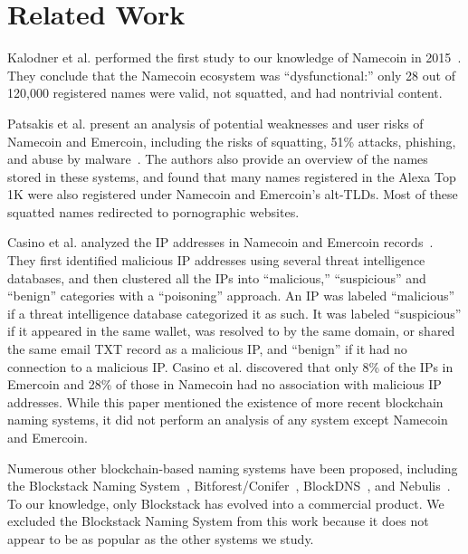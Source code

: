 \section{Related Work}
\label{sec:related}

Kalodner et al. performed the first study to our knowledge of 
Namecoin in 2015~\cite{kalodner_namecoin_2015}. They conclude 
that the Namecoin ecosystem was ``dysfunctional:'' only 28 
out of 120,000 registered names were valid, not squatted, and 
had nontrivial content.

Patsakis et al. present an analysis of potential weaknesses 
and user risks of 
Namecoin and Emercoin, including the risks of squatting, 51\% 
attacks, phishing, and abuse by 
malware~\cite{patsakis_unravelling_2020}. The authors also 
provide an overview of the names stored in these systems, and 
found that many names registered in the Alexa Top 1K were 
also registered under Namecoin and Emercoin's alt-TLDs. Most 
of these squatted names redirected to pornographic websites.

Casino et al. analyzed the IP addresses in Namecoin and 
Emercoin records~\cite{casino_unearthing_2021}. They first 
identified malicious IP addresses using several threat 
intelligence databases, and then clustered all the IPs into 
``malicious,'' ``suspicious'' and ``benign'' categories with 
a ``poisoning'' 
approach. An IP was labeled ``malicious'' if a threat 
intelligence database categorized it as such. It was labeled 
``suspicious'' if it appeared in the same wallet, was 
resolved to by the same domain, or shared the same email TXT 
record as a malicious IP, and ``benign'' if it had no 
connection to a malicious IP. Casino et al. discovered that 
only 8\% of the IPs in Emercoin and 28\% of those in Namecoin 
had no association with malicious IP addresses. While this 
paper mentioned the existence of more recent blockchain 
naming systems, it did not perform an analysis of any system 
except Namecoin and Emercoin.


Numerous other blockchain-based naming systems have been 
proposed, including
the Blockstack Naming System~\cite{ali2016blockstack}, 
Bitforest/Conifer~\cite{dong2018bitforest, dong2018conifer}, 
BlockDNS~\cite{blockdns}, and 
Nebulis~\cite{nebulis_2016}. To our knowledge, 
only Blockstack has evolved into a commercial product. We 
excluded the Blockstack Naming System from this work because 
it does not appear to be as popular as the other systems we 
study.

